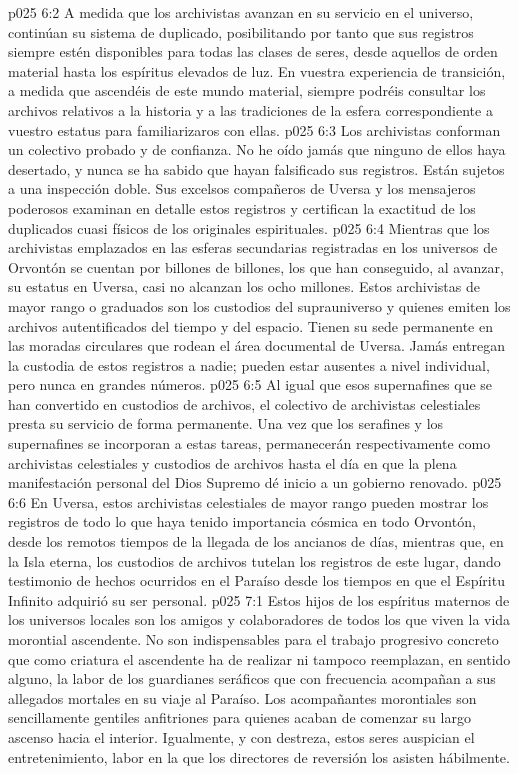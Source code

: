 \vs p025 6:2 A medida que los archivistas avanzan en su servicio en el universo, continúan su sistema de duplicado, posibilitando por tanto que sus registros siempre estén disponibles para todas las clases de seres, desde aquellos de orden material hasta los espíritus elevados de luz. En vuestra experiencia de transición, a medida que ascendéis de este mundo material, siempre podréis consultar los archivos relativos a la historia y a las tradiciones de la esfera correspondiente a vuestro estatus para familiarizaros con ellas.
\vs p025 6:3 Los archivistas conforman un colectivo probado y de confianza. No he oído jamás que ninguno de ellos haya desertado, y nunca se ha sabido que hayan falsificado sus registros. Están sujetos a una inspección doble. Sus excelsos compañeros de Uversa y los mensajeros poderosos examinan en detalle estos registros y certifican la exactitud de los duplicados cuasi físicos de los originales espirituales.
\vs p025 6:4 Mientras que los archivistas emplazados en las esferas secundarias registradas en los universos de Orvontón se cuentan por billones de billones, los que han conseguido, al avanzar, su estatus en Uversa, casi no alcanzan los ocho millones. Estos archivistas de mayor rango o graduados son los custodios del suprauniverso y quienes emiten los archivos autentificados del tiempo y del espacio. Tienen su sede permanente en las moradas circulares que rodean el área documental de Uversa. Jamás entregan la custodia de estos registros a nadie; pueden estar ausentes a nivel individual, pero nunca en grandes números.
\vs p025 6:5 Al igual que esos supernafines que se han convertido en custodios de archivos, el colectivo de archivistas celestiales presta su servicio de forma permanente. Una vez que los serafines y los supernafines se incorporan a estas tareas, permanecerán respectivamente como archivistas celestiales y custodios de archivos hasta el día en que la plena manifestación personal del Dios Supremo dé inicio a un gobierno renovado.
\vs p025 6:6 En Uversa, estos archivistas celestiales de mayor rango pueden mostrar los registros de todo lo que haya tenido importancia cósmica en todo Orvontón, desde los remotos tiempos de la llegada de los ancianos de días, mientras que, en la Isla eterna, los custodios de archivos tutelan los registros de este lugar, dando testimonio de hechos ocurridos en el Paraíso desde los tiempos en que el Espíritu Infinito adquirió su ser personal.
\vs p025 7:1 Estos hijos de los espíritus maternos de los universos locales son los amigos y colaboradores de todos los que viven la vida morontial ascendente. No son indispensables para el trabajo progresivo concreto que como criatura el ascendente ha de realizar ni tampoco reemplazan, en sentido alguno, la labor de los guardianes seráficos que con frecuencia acompañan a sus allegados mortales en su viaje al Paraíso. Los acompañantes morontiales son sencillamente gentiles anfitriones para quienes acaban de comenzar su largo ascenso hacia el interior. Igualmente, y con destreza, estos seres auspician el entretenimiento, labor en la que los directores de reversión los asisten hábilmente.
